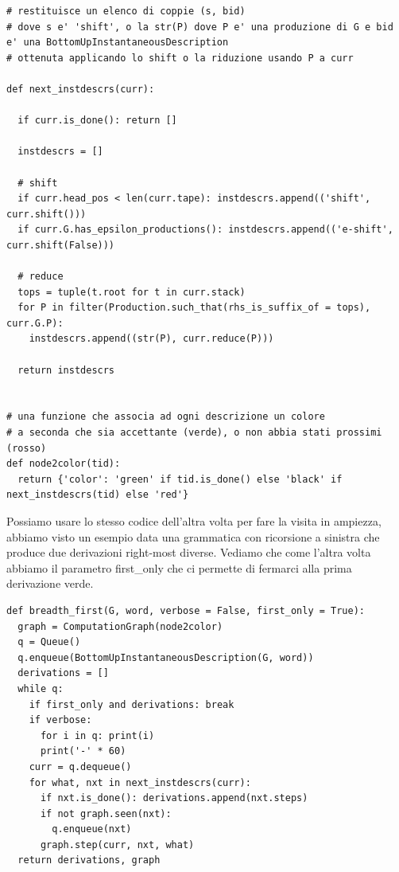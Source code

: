 \begin{lstlisting}
# restituisce un elenco di coppie (s, bid) 
# dove s e' 'shift', o la str(P) dove P e' una produzione di G e bid e' una BottomUpInstantaneousDescription
# ottenuta applicando lo shift o la riduzione usando P a curr

def next_instdescrs(curr):

  if curr.is_done(): return []

  instdescrs = []

  # shift
  if curr.head_pos < len(curr.tape): instdescrs.append(('shift', curr.shift()))
  if curr.G.has_epsilon_productions(): instdescrs.append(('e-shift', curr.shift(False)))
 
  # reduce
  tops = tuple(t.root for t in curr.stack)
  for P in filter(Production.such_that(rhs_is_suffix_of = tops), curr.G.P):
    instdescrs.append((str(P), curr.reduce(P)))

  return instdescrs


# una funzione che associa ad ogni descrizione un colore 
# a seconda che sia accettante (verde), o non abbia stati prossimi (rosso)
def node2color(tid):
  return {'color': 'green' if tid.is_done() else 'black' if next_instdescrs(tid) else 'red'}
\end{lstlisting}

Possiamo usare lo stesso codice dell'altra volta per fare la visita in ampiezza, abbiamo visto un esempio data una grammatica con ricorsione a sinistra che produce due derivazioni right-most diverse. Vediamo che come l'altra volta abbiamo il parametro first\_only che ci permette di fermarci alla prima derivazione verde.

\begin{lstlisting}
def breadth_first(G, word, verbose = False, first_only = True):
  graph = ComputationGraph(node2color)
  q = Queue()
  q.enqueue(BottomUpInstantaneousDescription(G, word))
  derivations = []
  while q:
    if first_only and derivations: break
    if verbose:
      for i in q: print(i)
      print('-' * 60)
    curr = q.dequeue()
    for what, nxt in next_instdescrs(curr):
      if nxt.is_done(): derivations.append(nxt.steps)
      if not graph.seen(nxt): 
        q.enqueue(nxt)
      graph.step(curr, nxt, what)
  return derivations, graph
\end{lstlisting}

